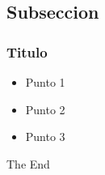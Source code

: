 \documentclass{beamer}
\begin{document}

\subsection{Subseccion} %

\begin{frame}
\frametitle{Titulo}
\begin{itemize}
\item Punto 1
\item Punto 2
\item Punto 3
\end{itemize}
\end{frame}


\begin{frame}
\Huge{\centerline{The End}}
\end{frame}

\end{document}
